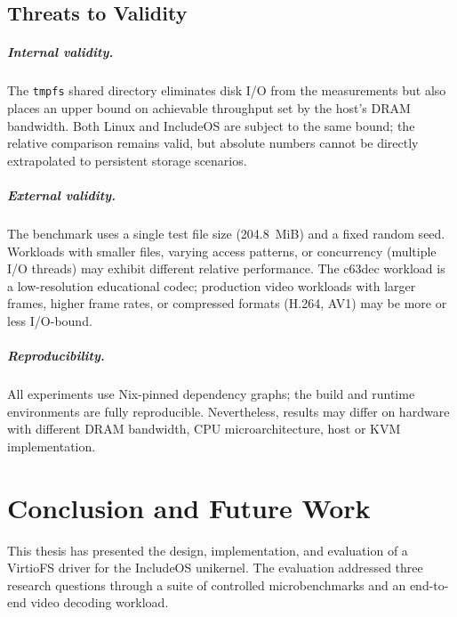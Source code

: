 \documentclass[12pt, a4paper, oneside]{report}
\begin{document}
\section{Threats to Validity}
\label{sec:threats}

\paragraph{Internal validity.}
The \texttt{tmpfs} shared directory eliminates disk I/O from the measurements but
also places an upper bound on achievable throughput set by the host's DRAM
bandwidth.  Both Linux and IncludeOS are subject to the same bound; the relative
comparison remains valid, but absolute numbers cannot be directly extrapolated to
persistent storage scenarios.

\paragraph{External validity.}
The benchmark uses a single test file size (204.8~MiB) and a fixed random seed.
Workloads with smaller files, varying access patterns, or concurrency (multiple
I/O threads) may exhibit different relative performance.  The c63dec workload is
a low-resolution educational codec; production video workloads with larger
frames, higher frame rates, or compressed formats (H.264, AV1) may be more or
less I/O-bound.

\paragraph{Reproducibility.}
All experiments use Nix-pinned dependency graphs; the build and runtime
environments are fully reproducible.  Nevertheless, results may differ on
hardware with different DRAM bandwidth, CPU microarchitecture, host or KVM
implementation.

\chapter{Conclusion and Future Work}
\label{chap:conclusion}

This thesis has presented the design, implementation, and evaluation of a VirtioFS
driver for the IncludeOS unikernel.  The evaluation addressed three research
questions through a suite of controlled microbenchmarks and an end-to-end video
decoding workload.
\end{document}
